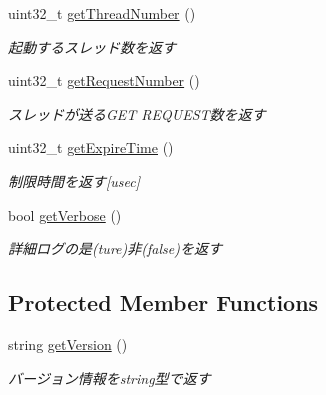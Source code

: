 \begin{DoxyCompactItemize}
\mbox{\label{class_http_load_tester_options_ac5c4dce62d2f5e10f2184e972f4b84d2}} 
uint32\+\_\+t \mbox{\hyperlink{class_http_load_tester_options_ac5c4dce62d2f5e10f2184e972f4b84d2}{get\+Thread\+Number}} ()
\begin{DoxyCompactList}\small\item\em 起動するスレッド数を返す \end{DoxyCompactList}\item 
\mbox{\label{class_http_load_tester_options_a6d59ec8444404c279011020ee8fc3883}} 
uint32\+\_\+t \mbox{\hyperlink{class_http_load_tester_options_a6d59ec8444404c279011020ee8fc3883}{get\+Request\+Number}} ()
\begin{DoxyCompactList}\small\item\em スレッドが送る\+G\+ET R\+E\+Q\+U\+E\+S\+T数を返す \end{DoxyCompactList}\item 
\mbox{\label{class_http_load_tester_options_a582d36d54cea7cdf87e08f2457aa46af}} 
uint32\+\_\+t \mbox{\hyperlink{class_http_load_tester_options_a582d36d54cea7cdf87e08f2457aa46af}{get\+Expire\+Time}} ()
\begin{DoxyCompactList}\small\item\em 制限時間を返す\mbox{[}usec\mbox{]} \end{DoxyCompactList}\item 
\mbox{\label{class_http_load_tester_options_a9cbb3361d020193d230d02d5526aa824}} 
bool \mbox{\hyperlink{class_http_load_tester_options_a9cbb3361d020193d230d02d5526aa824}{get\+Verbose}} ()
\begin{DoxyCompactList}\small\item\em 詳細ログの是(ture)非(false)を返す \end{DoxyCompactList}\end{DoxyCompactItemize}
\subsection*{Protected Member Functions}
\begin{DoxyCompactItemize}
\item 
\mbox{\label{class_http_load_tester_options_a64c39330a7c012b5d5327bd9bcecf3e6}} 
string \mbox{\hyperlink{class_http_load_tester_options_a64c39330a7c012b5d5327bd9bcecf3e6}{get\+Version}} ()
\begin{DoxyCompactList}\small\item\em バージョン情報をstring型で返す \end{DoxyCompactList}\end{DoxyCompactItemize}
